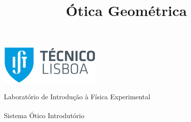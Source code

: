 \thispagestyle {empty}
\begin{center}
\begin{minipage}[c][5cm][t]{\textwidth}
\begin{center}
\includegraphics[width=5cm]{./otica_images/IST_A_RGB_POS.png}
\end{center}

\end{minipage}
\begin{minipage}[t][10cm][c]{\textwidth}
\centering
{\FontMb Laboratório de Introdução à Física Experimental} \\
\paragraph{}
\centering
{\FontLb\Huge \title{Ótica Geométrica}}
\paragraph{}
{\FontMb Sistema Ótico Introdutório} \\
\paragraph{}
{}
\end{minipage}

\begin{minipage}[c][1.5cm][c]{\textwidth}
\centering
{\FontLn }
\end{minipage}

\begin{minipage}[c][1.5cm][c]{\textwidth}
\centering



\end{minipage}
\begin{minipage}[c][3cm][c]{\textwidth}
\centering
\renewcommand{\arraystretch}{1.4}

\maketitle

\vspace{-5mm}
\hline
\vspace{-3mm}
\begin{center}
\centering

\end{center}
\end{minipage}
\end{center}
